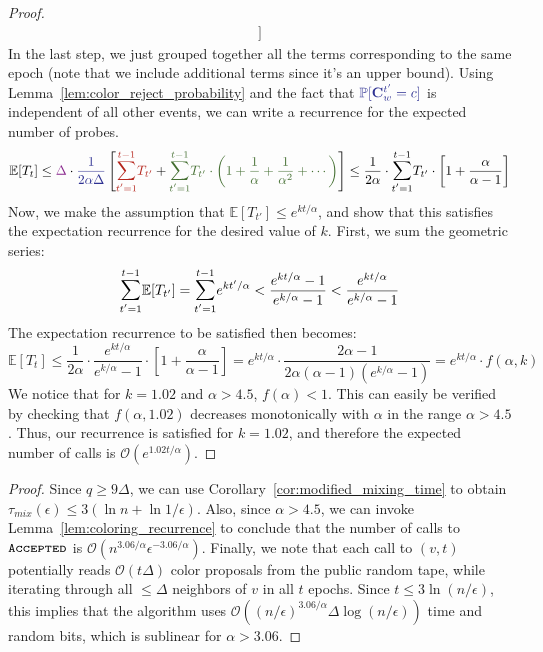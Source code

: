 \begin{proof}
\begin{align}
\Biggr]
\end{align}
In the last step, we just grouped together all the terms corresponding to the same epoch
(note that we include additional terms since it's an upper bound).
Using Lemma~\ref{lem:color_reject_probability} and the fact that $\textcolor{Blue}{\mathbb P[\vec C^{t'}_w = c]}$ is independent of all other events,
we can write a recurrence for the expected number of probes.
\begin{align}
\mathbb E[T_t] \le \textcolor{Fuchsia}{\Delta} \cdot \textcolor{Blue}{\frac{1}{2\alpha\Delta}}
\left[
\textcolor{BrickRed}{\mathlarger\sum\limits_{t'=1}^{t-1} T_{t'}} +
\textcolor{OliveGreen!80!black}{\mathlarger\sum\limits_{t'=1}^{t-1} T_{t'}\cdot \left(1 + \frac1\alpha + \frac1{\alpha^2} + \cdots\right)}
\right]
\le \frac{1}{2\alpha}\cdot \mathlarger\sum\limits_{t'=1}^{t-1} T_{t'}\cdot \left[1 + \frac{\alpha}{\alpha-1} \right]
\end{align}
Now, we make the assumption that $\mathbb E[T_{t'}]\le e^{k t/\alpha}$,
and show that this satisfies the expectation recurrence for the desired value of $k$.
First, we sum the geometric series:
\[
\mathlarger\sum\limits_{t'=1}^{t-1} \mathbb E[T_{t'}] = \mathlarger\sum\limits_{t'=1}^{t-1} e^{k t'/\alpha}
< \frac{e^{k t/\alpha}-1}{e^{k/\alpha}-1} < \frac{e^{k t/\alpha}}{e^{k/\alpha}-1}
\]
The expectation recurrence to be satisfied then becomes:
\[
\mathbb E[T_t]\le \frac 1{2\alpha}\cdot \frac{e^{k t/\alpha}}{e^{k/\alpha}-1}\cdot \left[ 1+ \frac{\alpha}{\alpha-1} \right]
= e^{k t/\alpha}\cdot \frac{2\alpha-1}{2\alpha(\alpha-1)(e^{k/\alpha}-1)} = e^{k t/\alpha}\cdot f(\alpha, k)
\]
We notice that for $k=1.02$ and $\alpha > 4.5$, $f(\alpha) < 1$.
This can easily be verified by checking that $f(\alpha,1.02)$ decreases monotonically with $\alpha$ in the range $\alpha > 4.5$.
Thus, our recurrence is satisfied for $k=1.02$, and therefore the expected number of calls is $\mathcal O(e^{1.02t/\alpha})$.
\end{proof}

\ColoringGrand*
\begin{proof}
Since $q\ge 9\Delta$, we can use Corollary~\ref{cor:modified_mixing_time} to obtain $\tau_{mix}(\epsilon) \le 3(\ln n + \ln 1/\epsilon)$.
Also, since $\alpha > 4.5$, we can invoke Lemma~\ref{lem:coloring_recurrence} to conclude that
the number of calls to $\texttt{\textsc{Accepted}}$ is $\mathcal O(n^{3.06/\alpha}\epsilon^{-3.06/\alpha})$.
Finally, we note that each call to $(v,t)$ potentially reads $\mathcal O(t\Delta)$ color proposals from the public random tape,
while iterating through all $\le \Delta$ neighbors of $v$ in all $t$ epochs.
Since $t \le 3\ln (n/\epsilon)$, this implies that the algorithm uses
$\mathcal O((n/\epsilon)^{3.06/\alpha}\Delta\log (n/\epsilon))$ time and random bits, which is sublinear for $\alpha > 3.06$.
\end{proof}

